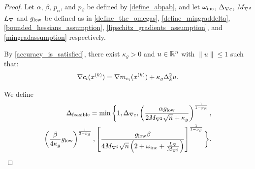
\begin{proof}
Let
$\alpha$, $\beta$, $p_{\alpha}$, and $p_{\beta}$
be defined by
\cref{define_abpab},
and let
$\omega_{\text{inc}}$,
${\Delta_{\nabla c}}$,
${M_{\nabla^2}}$
${L_{\nabla}}$
and ${ g_{\textrm{low}} }$
be defined as in
\cref{define_the_omegas},
\cref{define_mingraddelta},
\cref{bounded_hessians_assumption},
\cref{lipschitz_gradients_assumption},
and \cref{mingradassumption}
respectively.

By \cref{accuracy_is_satisfied}, there exist $\kappa_g > 0$ and $u\in\mathbb R^n$ with $\|u\|\le 1$ such that:
\begin{align}
\nabla c_i(x^{(k)}) = \nabla m_{c_i}(x^{(k)}) + \kappa_g\Delta_k^2 u. \label{model_error_for_gradient}
\end{align}

We define
\begin{align}
{\Delta_{\textrm{feasible}}} = \min\bigg\{
1,
{\Delta_{\nabla c}},
\left(\frac{\alpha { g_{\textrm{low}} }}{2 {M_{\nabla^2}} \sqrt{n} + \kappa_g}\right)^{\frac 1 {1-p_{\alpha}}}, \nonumber \\
\left(\frac{\beta}{4\kappa_g}{ g_{\textrm{low}} }\right)^{\frac 1 {2 - p_{\beta}}}, 
\left[\frac {{ g_{\textrm{low}} }  \beta} {4{M_{\nabla^2}}\sqrt{n}\left(2 + \omega_{\text{inc}} + \frac {{L_{\nabla}}} {{M_{\nabla^2}}} \right)}\right]^{\frac1 {1 - p_{\beta}} }
\bigg\}. \label{define_delta_feasible}
\end{align}




\end{proof}
